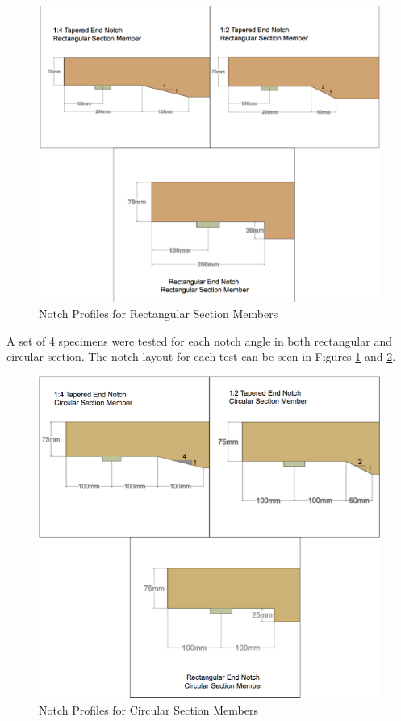 \documentclass[11pt,a4paper]{article}
\numberwithin{equation}{subsection}
\begin{document}
\begin{figure}[h]
	\begin{center}
		\includegraphics[scale=0.4]{Notch_Angles}
	\end{center}
	\caption{Notch Profiles for Rectangular Section Members}
	\label{fig:Rectangular2}
\end{figure}
\pagebreak

\noindent
A set of 4 specimens were tested for each notch angle in both rectangular and circular section. The notch layout for each test can be seen in Figures \ref{fig:Rectangular2} and \ref{fig:Circular}.
\vspace*{\baselineskip}
\begin{figure}[h]
	\begin{center}
		\includegraphics[scale=0.55]{Circular_Notch_Angles}
	\end{center}
	\caption{Notch Profiles for Circular Section Members}
	\label{fig:Circular}
\end{figure}
\end{document}
